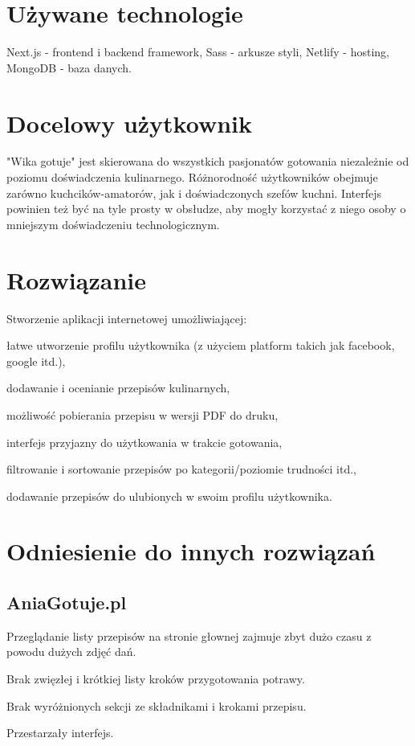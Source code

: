 \documentclass{article}
\newenvironment{itemize.zip}
{ \begin{itemize}
    \setlength{\itemsep}{0pt}
    \setlength{\parskip}{0pt}
    \setlength{\parsep}{0pt}     }
{ \end{itemize}                  }
\begin{document}
\section{Używane technologie}
      Next.js - frontend i backend framework,
      Sass - arkusze styli,
      Netlify - hosting,
      MongoDB - baza danych.

\section{Docelowy użytkownik}
"Wika gotuje" jest skierowana do wszystkich pasjonatów gotowania niezależnie od poziomu doświadczenia kulinarnego. Różnorodność użytkowników obejmuje zarówno kuchcików-amatorów, jak 
i doświadczonych szefów kuchni. Interfejs powinien też być na tyle prosty w obsłudze, aby mogły korzystać z niego osoby o mniejszym doświadczeniu technologicznym. 



\section{Rozwiązanie}
Stworzenie aplikacji internetowej umożliwiającej:
\begin{itemize.zip}
    \item łatwe utworzenie profilu użytkownika (z użyciem platform takich jak facebook, google itd.),
    \item dodawanie i ocenianie przepisów kulinarnych,
    \item możliwość pobierania przepisu w wersji PDF do druku,
    \item interfejs przyjazny do użytkowania w trakcie gotowania,
    \item filtrowanie i sortowanie przepisów po kategorii/poziomie trudności itd.,
    \item dodawanie przepisów do ulubionych w swoim profilu użytkownika.
\end{itemize.zip}

\section{Odniesienie do innych rozwiązań}
\subsection{AniaGotuje.pl}
\begin{itemize.zip}
    \item Przeglądanie listy przepisów na stronie głownej zajmuje zbyt dużo czasu z powodu dużych zdjęć dań.
    \item Brak zwięzłej i krótkiej listy kroków przygotowania potrawy.
    \item Brak wyróżnionych sekcji ze składnikami i krokami przepisu.
    \item Przestarzały interfejs.
\end{itemize.zip}
\end{document}
